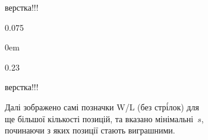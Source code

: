 \begin{figure}[!b]
\begin{figure}[p]
\begin{sffamily}
\ifAfour
\ifBigStretch
\errorNotCalculatedYet
\begin{Huge}верстка!!!\end{Huge}


\phraseI
\phraseII
\phraseIII
\phraseIV
\phraseV
\else
{}
0.075\textwidth
\phraseI{}
\phraseII{}
\phraseIII{}
\phraseIV{}
\phraseV{}
\par
\vspace{-17\baselineskip}
\par\noindent\hspace*{0.49\textwidth}
\par
\vspace{-2\baselineskip}
\noindent

\fi
\else
\ifBigStretch
{}
0em \textwidth
\phraseI{}
\phraseII{}
\phraseIII{}
\par
\vspace{-7\baselineskip}
\noindent

0.23\textwidth
\phraseIV{}
\phraseV{}
\par
\vspace{-10\baselineskip}
\noindent

\else
\errorNotCalculatedYet
\begin{Huge}верстка!!!\end{Huge}


\phraseI{}
\phraseII{}
\phraseIII{}
\phraseIV{}
\phraseV{}
\fi
\fi

\ifAfour\vspace{0.25ex}\par\hspace*{0.075\textwidth}\fi%
Далі зображено самі позначки W/L (без стр\'{і}\-лок) для ще більшої кількості позицій,
та вказано мінімальні~$s$, починаючи з яких позиції стають виграшними.


\end{sffamily}
\end{figure}
\end{figure}
